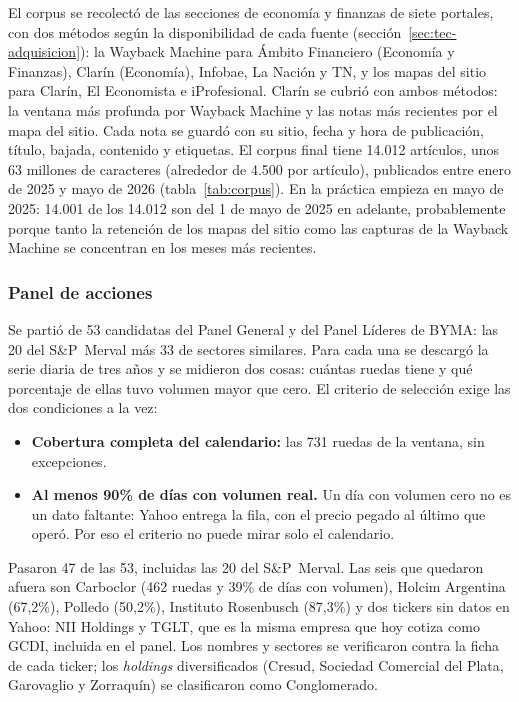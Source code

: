 El corpus se recolectó de las secciones de economía y finanzas de siete portales, con dos
métodos según la disponibilidad de cada fuente (sección~\ref{sec:tec-adquisicion}): la
Wayback Machine para Ámbito Financiero (Economía y Finanzas), Clarín (Economía), Infobae, La
Nación y TN, y los mapas del sitio para Clarín, El Economista e iProfesional. Clarín se cubrió
con ambos métodos: la ventana más profunda por Wayback Machine y las notas más recientes por
el mapa del sitio. Cada nota se guardó con su sitio, fecha y hora de publicación, título,
bajada, contenido y etiquetas. El corpus final tiene 14.012 artículos, unos 63 millones de
caracteres (alrededor de 4.500 por artículo), publicados entre enero de 2025 y mayo de 2026
(tabla~\ref{tab:corpus}). En la práctica empieza en mayo de 2025: 14.001 de los 14.012 son
del 1 de mayo de 2025 en adelante, probablemente porque tanto la retención de los mapas del
sitio como las capturas de la Wayback Machine se concentran en los meses más recientes.

\subsubsection{Panel de acciones}

Se partió de 53 candidatas del Panel General y del Panel Líderes de BYMA: las 20 del
S\&P~Merval más 33 de sectores similares. Para cada una se descargó la serie diaria de tres
años y se midieron dos cosas: cuántas ruedas tiene y qué porcentaje de ellas tuvo volumen
mayor que cero. El criterio de selección exige las dos condiciones a la vez:

\begin{itemize}
  \item \textbf{Cobertura completa del calendario:} las 731 ruedas de la ventana, sin
        excepciones.
  \item \textbf{Al menos 90\% de días con volumen real.} Un día con volumen cero no es un dato
        faltante: Yahoo entrega la fila, con el precio pegado al último que operó. Por eso el
        criterio no puede mirar solo el calendario.
\end{itemize}

Pasaron 47 de las 53, incluidas las 20 del S\&P~Merval. Las seis que quedaron afuera son
Carboclor (462 ruedas y 39\% de días con volumen), Holcim Argentina (67,2\%), Polledo
(50,2\%), Instituto Rosenbusch (87,3\%) y dos tickers sin datos en Yahoo: NII Holdings y TGLT,
que es la misma empresa que hoy cotiza como GCDI, incluida en el panel. Los nombres y sectores
se verificaron contra la ficha de cada ticker; los \textit{holdings} diversificados (Cresud,
Sociedad Comercial del Plata, Garovaglio y Zorraquín) se clasificaron como Conglomerado.

